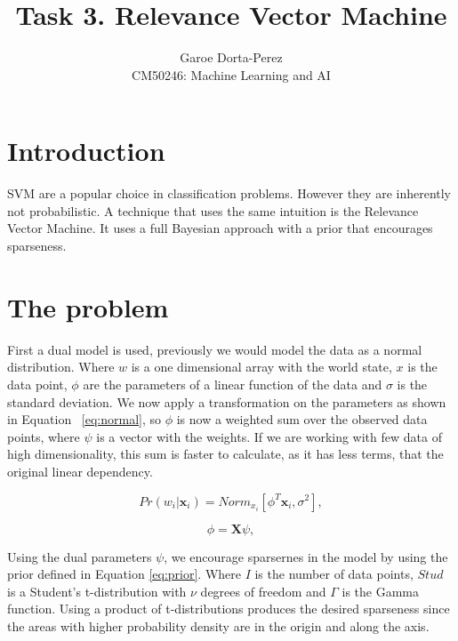 \documentclass[12pt]{article}
\begin{document}
  
\title{Task 3. Relevance Vector Machine}
\author{Garoe Dorta-Perez\\
CM50246: Machine Learning and AI}
 
\maketitle
 
\section{Introduction}
 
SVM  are a popular choice in classification problems.
However they are inherently not probabilistic.
A technique that uses the same intuition is the Relevance Vector Machine.
It uses a full Bayesian approach with a prior that encourages sparseness.

\section{The problem}

First a dual model is used, previously we would model the data as a normal distribution.
Where $w$ is a one dimensional array with the world state, $x$ is the data point, $\phi$ are the parameters of a linear function of the data and $\sigma$ is the standard deviation.
We now apply a transformation on the parameters as shown in Equation ~\ref{eq:normal}, so $\phi$ is now a weighted sum over the observed data points, where $\psi$ is a vector with the weights.
If we are working with few data of high dimensionality, this sum is faster to calculate, as it has less terms, that the original linear dependency.

\begin{equation}
\label{eq:normal}
Pr(w_i|\mathbf{x}_i) = Norm_{x_i}[\phi^T \mathbf{x}_i, \sigma^2],
\end{equation}

\begin{equation}
\label{eq:dual}
\phi = \mathbf{X} \psi,
\end{equation}

Using the dual parameters $\psi$, we encourage sparsernes in the model by using the prior defined in Equation \ref{eq:prior}.
Where $I$ is the number of data points, $Stud$ is a Student's t-distribution with $\nu$ degrees of freedom and $\Gamma$ is the Gamma function.
Using a product of t-distributions produces the desired sparseness since the areas with higher probability density are in the origin and along the axis.
\end{document}
